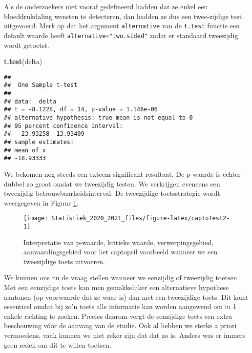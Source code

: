 \documentclass[
  12pt,dutch,coursenotes]{book}
\newenvironment{Shaded}{\begin{snugshade}}{\end{snugshade}}
\newcommand{\KeywordTok}[1]{\textcolor[rgb]{0.13,0.29,0.53}{\textbf{#1}}}
\newcommand{\NormalTok}[1]{#1}
\theoremstyle{definition}
\theoremstyle{definition}
\theoremstyle{definition}
\theoremstyle{remark}
\begin{document}
Als de onderzoekers niet vooraf gedefineerd hadden dat ze enkel een bloeddrukdaling wensten te detecteren, dan hadden ze dus een twee-zijdige test uitgevoerd.
Merk op dat het argument \texttt{alternative} van de \texttt{t.test} functie een default waarde heeft \texttt{alternative="two.sided"} zodat er standaard tweezijdig wordt getoetst.

\begin{Shaded}
\begin{Highlighting}[]
\KeywordTok{t.test}\NormalTok{(delta)}
\end{Highlighting}
\end{Shaded}

\begin{verbatim}
## 
##  One Sample t-test
## 
## data:  delta
## t = -8.1228, df = 14, p-value = 1.146e-06
## alternative hypothesis: true mean is not equal to 0
## 95 percent confidence interval:
##  -23.93258 -13.93409
## sample estimates:
## mean of x 
## -18.93333
\end{verbatim}

We bekomen nog steeds een exteem significant resultaat. De p-waarde is echter dubbel zo groot omdat we tweezijdig testen.
We verkrijgen eveneens een tweezijdig betrouwbaarheidsinterval.
De tweezijdige toetsstrategie wordt weergegeven in Figuur \ref{fig:captoTest2}.

\begin{figure}

{\centering \texttt{[image: Statistiek\_2020\_2021\_files/figure-latex/captoTest2-1]} 

}

\caption{Interpretatie van p-waarde, kritieke waarde, verwerpingsgebied, aanvaardingsgebied voor het captopril voorbeeld wanneer we een tweezijdige toets uitvoeren.}\label{fig:captoTest2}
\end{figure}

We kunnen ons nu de vraag stellen wanneer we eenzijdig of tweezijdig toetsen.
Met een eenzijdige toets kan men gemakkelijker een alternatieve hypothese
aantonen (op voorwaarde dat ze waar is) dan met een tweezijdige toets. Dit
komt essentieel omdat bij zo'n toets alle informatie kan worden aangewend om
in 1 enkele richting te zoeken. Precies daarom vergt de eenzijdige toets een
extra beschouwing vóór de aanvang van de studie. Ook al hebben we sterke
a priori vermoedens, vaak kunnen we niet zeker zijn dat dat zo is.
Anders was er immers geen reden om
dit te willen toetsen.
\end{document}
